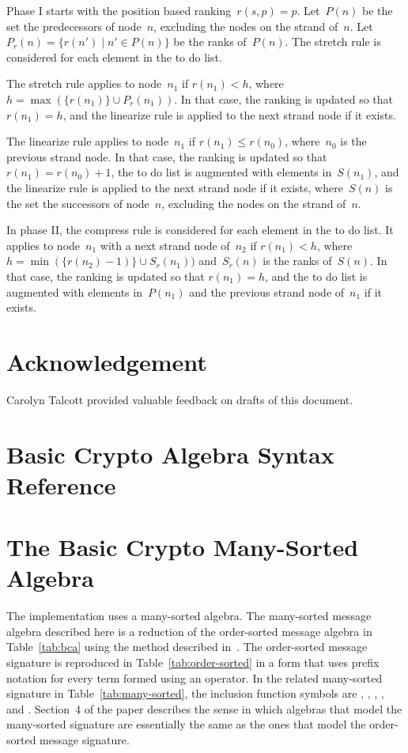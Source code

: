 \documentclass[12pt]{report}
\theoremstyle{definition}
\begin{document}
Phase I starts with the position based ranking~$r(s,p)=p$.  Let~$P(n)$
be the set the predecessors of node~$n$, excluding the nodes on the
strand of~$n$.  Let~$P_r(n)=\{r(n')\mid n'\in P(n)\}$ be the ranks
of~$P(n)$.  The stretch rule is considered for each element in the
to do list.

The stretch rule applies to node~$n_1$ if $r(n_1)<h$, where
$h=\max(\{r(n_1)\}\cup P_r(n_1))$.  In that case, the ranking is updated
so that $r(n_1)=h$, and the linearize rule is applied to the next strand
node if it exists.

The linearize rule applies to node~$n_1$ if $r(n_1)\leq r(n_0)$,
where~$n_0$ is the previous strand node.  In that case, the ranking is
updated so that $r(n_1)=r(n_0)+1$, the to do list is augmented with
elements in~$S(n_1)$, and the linearize rule is applied to the next
strand node if it exists, where~$S(n)$ is the set the successors of
node~$n$, excluding the nodes on the strand of~$n$.

In phase II, the compress rule is considered for each element in the
to do list.  It applies to node~$n_1$ with a next strand node of~$n_2$
if $r(n_1)<h$, where $h=\min(\{r(n_2)-1)\}\cup S_r(n_1))$ and~$S_r(n)$
is the ranks of~$S(n)$.  In that case, the ranking is updated so that
$r(n_1)=h$, and the to do list is augmented with elements in~$P(n_1)$
and the previous strand node of~$n_1$ if it exists.

\chapter*{Acknowledgement}

Carolyn Talcott provided valuable feedback on drafts of this document.

\appendix

\chapter{Basic Crypto Algebra Syntax Reference}\label{cha:bca syntax reference}



\chapter{The Basic Crypto Many-Sorted Algebra}\label{cha:bca}

The implementation uses a many-sorted algebra.  The many-sorted
message algebra described here is a reduction of the order-sorted
message algebra in Table~\ref{tab:bca} using the method described
in~\cite[Section~4]{GoguenMeseguer92}.  The order-sorted message
signature is reproduced in Table~\ref{tab:order-sorted} in a form that
uses prefix notation for every term formed using an operator.  In the
related many-sorted signature in Table~\ref{tab:many-sorted}, the
inclusion function symbols are ,
, , , and .  Section~4 of the
paper describes the sense in which algebras that model the many-sorted
signature are essentially the same as the ones that model the
order-sorted message signature.
\end{document}
